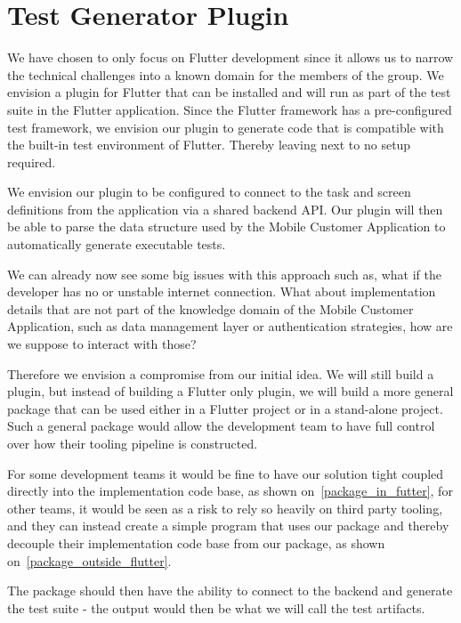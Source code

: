 \section{Test Generator Plugin}
We have chosen to only focus on Flutter development since it allows us to narrow the technical challenges into a known domain for the members of the group.
We envision a plugin for Flutter that can be installed and will run as part of the test suite in the Flutter application.
Since the Flutter framework has a pre-configured test framework, we envision our plugin to generate code that is compatible with the built-in test environment of Flutter.
Thereby leaving next to no setup required.

We envision our plugin to be configured to connect to the task and screen definitions from the application via a shared backend API.
Our plugin will then be able to parse the data structure used by the Mobile Customer Application to automatically generate executable tests.

We can already now see some big issues with this approach such as, what if the developer has no or unstable internet connection.
What about implementation details that are not part of the knowledge domain of the Mobile Customer Application, such as data management layer or authentication strategies, how are we suppose to interact with those?

Therefore we envision a compromise from our initial idea. 
We will still build a plugin, but instead of building a Flutter only plugin, we will build a more general package that can be used either in a Flutter project or in a stand-alone project.
Such a general package would allow the development team to have full control over how their tooling pipeline is constructed.

For some development teams it would be fine to have our solution tight coupled directly into the implementation code base, as shown on~\autoref{package_in_futter}, for other teams, it would be seen as a risk to rely so heavily on third party tooling, and they can instead create a simple program that uses our package and thereby decouple their implementation code base from our package, as shown on~\autoref{package_outside_flutter}. 

The package should then have the ability to connect to the backend and generate the test suite - the output would then be what we will call the test artifacts.

